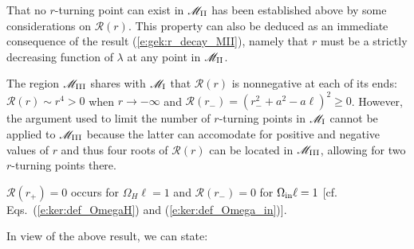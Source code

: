 \begin{remark}
That no $r$-turning point can exist in $\mathscr{M}_{\rm II}$ has been established
above by some considerations on $\mathcal{R}(r)$. This property can also be deduced as
an immediate consequence of the result (\ref{e:gek:r_decay_MII}), namely
that $r$ must be a strictly decreasing function of $\lambda$ at any point
in $\mathscr{M}_{\rm II}$.
\end{remark}


\begin{remark}
The region $\mathscr{M}_{\rm III}$ shares with $\mathscr{M}_{\rm I}$ that $\mathcal{R}(r)$ is
nonnegative at each of its ends: $\mathcal{R}(r) \sim r^4 > 0$ when $r\to -\infty$
and $\mathcal{R}(r_-) = (r_-^2 + a^2 - a \ell)^2 \geq 0$. However, the argument
used to limit the number of $r$-turning points in $\mathscr{M}_{\rm I}$
cannot be applied to $\mathscr{M}_{\rm III}$ because the latter can accomodate for positive and negative
values of $r$ and thus four roots of $\mathcal{R}(r)$ can be located in $\mathscr{M}_{\rm III}$, allowing
for two $r$-turning points there.
\end{remark}


\begin{remark}
$\mathcal{R}(r_+) = 0$ occurs for $\Omega_H \ell = 1$
and $\mathcal{R}(r_-) = 0$ for $\Omega_{\rm in} \ell = 1$ [cf. Eqs.~(\ref{e:ker:def_OmegaH}) and (\ref {e:ker:def_Omega_in})].
\end{remark}


In view of the above result, we can state:

